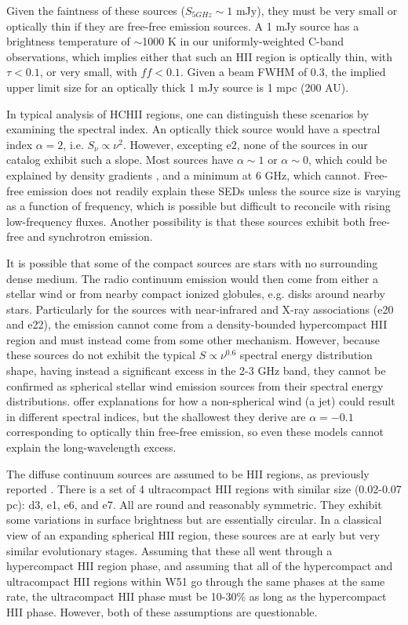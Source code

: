 Given the faintness of these sources ($S_{5 GHz} \sim 1$ mJy), they must be
very small or optically thin if they are free-free emission sources.  A 1 mJy
source has a brightness temperature of $\sim$1000 K in our uniformly-weighted
C-band observations, which implies either that such an HII region is optically
thin, with $\tau < 0.1$, or very small, with $ff<0.1$.  Given a beam FWHM of
0.3\arcsec, the implied upper limit size for an optically thick 1 mJy source is
1 mpc (200 AU).

In typical analysis of HCHII regions, one can distinguish these scenarios by
examining the spectral index.  An optically thick source would have a spectral
index $\alpha=2$, i.e. $S_\nu \propto \nu^2$.  However, excepting e2, none of
the sources in our catalog exhibit such a slope.  Most sources have
$\alpha\sim1$ or $\alpha\sim0$, which could be explained by density gradients
\citep{Keto2008a,Galvan-Madrid2009a}, and a minimum at 6 GHz, which cannot.
Free-free emission does not readily explain these SEDs unless the source size
is varying as a function of frequency, which is possible but difficult to
reconcile with rising low-frequency fluxes.  Another possibility is that these
sources exhibit both free-free and synchrotron emission.

It is possible that some of the compact sources are stars with no surrounding
dense medium.  The radio continuum emission would then come from either a
stellar wind \citep{Gaume1993a} or from nearby compact ionized globules, e.g.
disks around nearby stars.  Particularly for the sources with near-infrared and
X-ray associations (e20 and e22), the emission cannot come from a
density-bounded hypercompact HII region and must instead come from some other
mechanism.  However, because these sources do not exhibit the typical
$S\propto\nu^{0.6}$ spectral energy distribution shape, having instead a
significant excess in the 2-3 GHz band, they cannot be confirmed as
spherical stellar wind emission sources from their spectral energy distributions.
\citet{Reynolds1986a} offer explanations for how a non-spherical wind (a jet)
could result in different spectral indices, but the shallowest they derive
are $\alpha=-0.1$ corresponding to optically thin free-free emission, so even
these models cannot explain the long-wavelength excess.

The diffuse continuum sources are assumed to be HII regions, as previously
reported \citep{Gaume1993a,Mehringer1994a}.  There is a set of 4 ultracompact
HII regions with similar size (0.02-0.07 pc): d3, e1, e6, and e7.  All are
round and reasonably symmetric.  They exhibit some variations in surface
brightness but are essentially circular.  In a classical view of an expanding
spherical HII region, these sources are at early but very similar evolutionary
stages.  Assuming that these all went through a hypercompact HII region phase,
and assuming that all of the hypercompact and ultracompact HII regions within
W51 go through the same phases at the same rate, the ultracompact HII phase
must be 10-30\% as long as the hypercompact HII phase.  However, both of these
assumptions are questionable.


